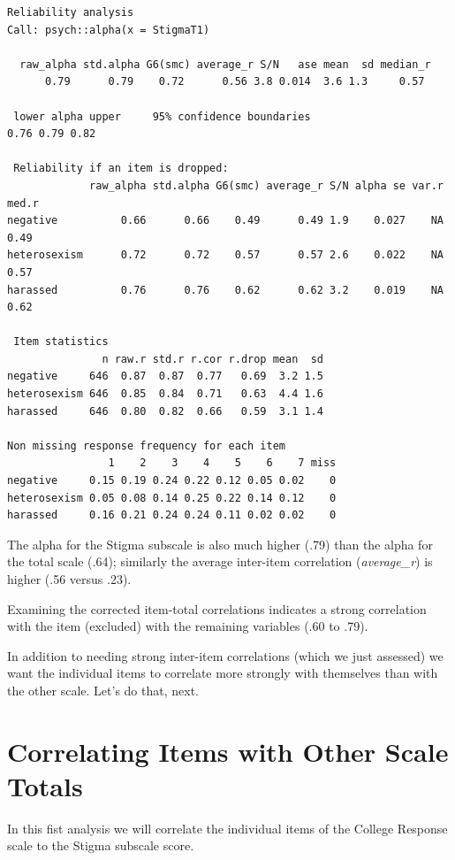 \documentclass[
  english,
]{book}
\begin{document}
\begin{verbatim}
Reliability analysis   
Call: psych::alpha(x = StigmaT1)

  raw_alpha std.alpha G6(smc) average_r S/N   ase mean  sd median_r
      0.79      0.79    0.72      0.56 3.8 0.014  3.6 1.3     0.57

 lower alpha upper     95% confidence boundaries
0.76 0.79 0.82 

 Reliability if an item is dropped:
             raw_alpha std.alpha G6(smc) average_r S/N alpha se var.r med.r
negative          0.66      0.66    0.49      0.49 1.9    0.027    NA  0.49
heterosexism      0.72      0.72    0.57      0.57 2.6    0.022    NA  0.57
harassed          0.76      0.76    0.62      0.62 3.2    0.019    NA  0.62

 Item statistics 
               n raw.r std.r r.cor r.drop mean  sd
negative     646  0.87  0.87  0.77   0.69  3.2 1.5
heterosexism 646  0.85  0.84  0.71   0.63  4.4 1.6
harassed     646  0.80  0.82  0.66   0.59  3.1 1.4

Non missing response frequency for each item
                1    2    3    4    5    6    7 miss
negative     0.15 0.19 0.24 0.22 0.12 0.05 0.02    0
heterosexism 0.05 0.08 0.14 0.25 0.22 0.14 0.12    0
harassed     0.16 0.21 0.24 0.24 0.11 0.02 0.02    0
\end{verbatim}

The alpha for the Stigma subscale is also much higher (.79) than the alpha for the total scale (.64); similarly the average inter-item correlation (\emph{average\_r}) is higher (.56 versus .23).

Examining the corrected item-total correlations indicates a strong correlation with the item (excluded) with the remaining variables (.60 to .79).

In addition to needing strong inter-item correlations (which we just assessed) we want the individual items to correlate more strongly with themselves than with the other scale. Let's do that, next.

\hypertarget{correlating-items-with-other-scale-totals}{%
\section{Correlating Items with Other Scale Totals}\label{correlating-items-with-other-scale-totals}}

In this fist analysis we will correlate the individual items of the College Response scale to the Stigma subscale score.
\end{document}
